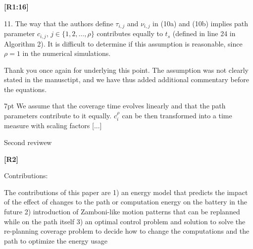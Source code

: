 \documentclass[10pt]{letter}
\newenvironment{formal}{%
  \def\FrameCommand{%
    \hspace{1pt}%
    {\color{red}\vrule width 2pt}%
    {\color{formalshade}\vrule width 4pt}%
    \colorbox{formalshade}%
  }%
  \MakeFramed{\advance\hsize-\width\FrameRestore}%
  \noindent\hspace{-4.55pt}%
  \begin{adjustwidth}{}{7pt}%
  \vspace{2pt}\vspace{2pt}%
}
{%
  \vspace{2pt}\end{adjustwidth}\endMakeFramed%
}
\begin{document}
{\hspace*{-4.5em}\textbf{[R1:16]}\vspace*{-1.9em}}

11. The way that the authors define $\tau_{i,j}$ and $\nu_{i,j}$ in (10a) and (10b) implies path parameter $c_{i,j}$, $j\in\{1,2,\dots,\rho\}$ contributes equally to $t_s$ (defined in line 24 in Algorithm 2). It is difficult to determine if this assumption is reasonable, since $\rho=1$ in the numerical simulations.

{\color{blue} 

{\hspace*{-4.5em}{[R1:16]}\vspace*{-1.9em}}

Thank you once again for underlying this point. The assumption was not clearly stated in the manusctipt, and we have thus added additional commentary before the equations.

\begin{formal}\color{black}
  {\color{blue}W}e assume that the coverage time evolves linearly{ \color{blue}and that the }path parameters{ \color{blue}contribute to it equally.} $c_i^\rho$ can be {\color{blue}then} transformed into a time measure with scaling factors 
  [...]
  \vspace*{1ex}
\end{formal}
}













\newpage

{Second reviwew}

\vspace{3em}

{\hspace*{-4.5em}\textbf{[R2]}\vspace*{-1.9em}}

Contributions:

The contributions of this paper are 1) an energy model that predicts the impact of the effect of changes to the path or computation energy on the battery in the future 2) introduction of Zamboni-like motion patterns that can be replanned while on the path itself 3) an optimal control problem and solution to solve the re-planning coverage problem to decide how to change the computations and the path to optimize the energy usage
\end{document}
